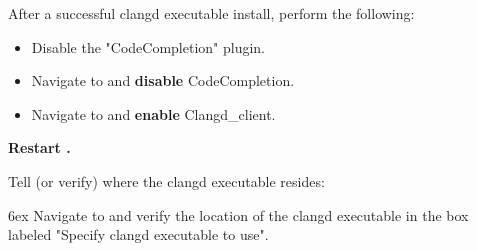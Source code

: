 After a successful clangd executable install, perform the following:

\begin{itemize}[noitemsep]
\item Disable the "CodeCompletion" plugin.
\item Navigate to  and \textbf{disable} CodeCompletion.
\item Navigate to  and \textbf{enable} Clangd\_client.
\end{itemize}
\textbf{Restart \codeblocks.}

Tell (or verify) \codeblocks where the clangd executable resides:\par
\begingroup
\leftskip 6ex
Navigate to  and verify the location of the clangd executable in the box labeled "Specify clangd executable to use".
\par
\endgroup

